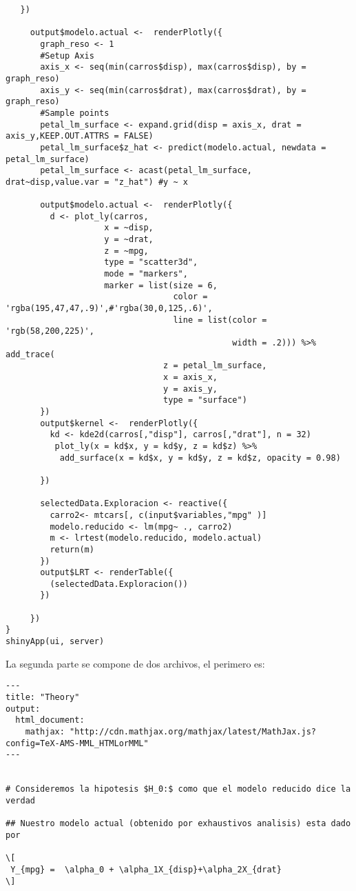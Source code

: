 \documentclass[peerreview]{IEEEtran}
\begin{document}
\begin{verbatim}
   })
  
     output$modelo.actual <-  renderPlotly({
       graph_reso <- 1
       #Setup Axis
       axis_x <- seq(min(carros$disp), max(carros$disp), by = graph_reso)
       axis_y <- seq(min(carros$drat), max(carros$drat), by = graph_reso)
       #Sample points
       petal_lm_surface <- expand.grid(disp = axis_x, drat = axis_y,KEEP.OUT.ATTRS = FALSE)
       petal_lm_surface$z_hat <- predict(modelo.actual, newdata = petal_lm_surface)
       petal_lm_surface <- acast(petal_lm_surface,  drat~disp,value.var = "z_hat") #y ~ x
       
       output$modelo.actual <-  renderPlotly({ 
         d <- plot_ly(carros, 
                    x = ~disp, 
                    y = ~drat, 
                    z = ~mpg,
                    type = "scatter3d", 
                    mode = "markers",
                    marker = list(size = 6,
                                  color = 'rgba(195,47,47,.9)',#'rgba(30,0,125,.6)',
                                  line = list(color = 'rgb(58,200,225)',
                                              width = .2))) %>% add_trace(
                                z = petal_lm_surface,
                                x = axis_x,
                                y = axis_y,
                                type = "surface") 
       })
       output$kernel <-  renderPlotly({ 
         kd <- kde2d(carros[,"disp"], carros[,"drat"], n = 32)
          plot_ly(x = kd$x, y = kd$y, z = kd$z) %>% 
           add_surface(x = kd$x, y = kd$y, z = kd$z, opacity = 0.98)
         
       })
       
       selectedData.Exploracion <- reactive({
         carro2<- mtcars[, c(input$variables,"mpg" )]
         modelo.reducido <- lm(mpg~ ., carro2)
         m <- lrtest(modelo.reducido, modelo.actual)
         return(m) 
       })
       output$LRT <- renderTable({
         (selectedData.Exploracion())
       })
       
     })
}
shinyApp(ui, server)
\end{verbatim}
La segunda parte se compone de dos archivos, el perimero es:
\begin{verbatim}
---
title: "Theory"
output: 
  html_document:
    mathjax: "http://cdn.mathjax.org/mathjax/latest/MathJax.js?config=TeX-AMS-MML_HTMLorMML"
---


# Consideremos la hipotesis $H_0:$ como que el modelo reducido dice la verdad

## Nuestro modelo actual (obtenido por exhaustivos analisis) esta dado por 

\[
 Y_{mpg} =  \alpha_0 + \alpha_1X_{disp}+\alpha_2X_{drat}
\]
\end{verbatim}
\end{document}
